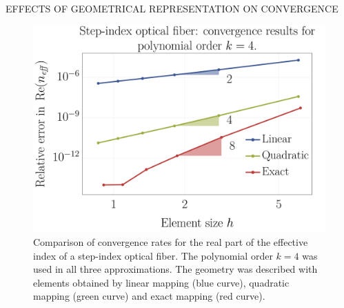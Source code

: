 \documentclass[debug]{beamer} %
\begin{document}
\begin{frame}
\begin{minipage}[t]{0.45\textwidth}
\begin{block}{\boxnumber EFFECTS OF GEOMETRICAL REPRESENTATION ON CONVERGENCE}
        	\begin{figure}[ht]
	            \centering
	            \includegraphics[width=0.7\linewidth]{images/convergenceRates_k4_poster.png}
	            \caption{Comparison of convergence rates for the real part of the effective index of a step-index optical fiber. The polynomial order $k=4$ was used in all three approximations. The geometry was described with elements obtained by linear mapping (blue curve), quadratic mapping (green curve) and exact mapping (red curve).}
	            \label{fig:convergence-step}
        	\end{figure}
        

\end{block}
\end{minipage}
\end{frame}
\end{document}
